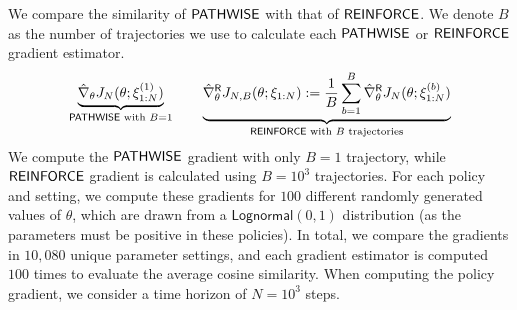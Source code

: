 We compare the similarity of $\mathsf{PATHWISE}$ with that of $\mathsf{REINFORCE}$. 
We denote $B$ as the number of trajectories we use to calculate each $\mathsf{PATHWISE}$ or $\mathsf{REINFORCE}$ gradient estimator.
\begin{align}
\underbrace{\hat{\nabla}_{\theta} J_{N}(\theta; \xi^{(1)}_{1:N})}_{\mathsf{PATHWISE}\text{ with }B=1} \qquad
\underbrace{\hat{\nabla}^{\mathsf{R}}_{\theta} J_{N,B}(\theta; \xi_{1:N}) := \frac{1}{B} \sum_{b = 1}^{B} \hat{\nabla}^{\mathsf{R}}_{\theta} J_{N}(\theta; \xi^{(b)}_{1:N})}_{\mathsf{REINFORCE}\text{ with }B\text{ trajectories}}
\end{align}
We compute the $\mathsf{PATHWISE}$ gradient with only $B = 1$ trajectory, while $\mathsf{REINFORCE}$ gradient is calculated using $B=10^3$ trajectories.
For each policy and setting, we compute these gradients for $100$ different randomly generated values of $\theta$, which are drawn from a $\mathsf{Lognormal}(0,1)$ distribution (as the parameters must be positive in these policies). In total, we compare the gradients in $10,080$ unique parameter settings, and each gradient estimator is computed $100$ times to evaluate the average cosine similarity. When computing the policy gradient, we consider a time horizon of $N = 10^3$ steps. 



